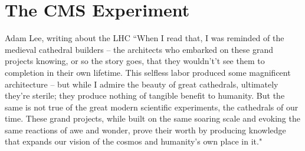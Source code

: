 \chapter{The CMS Experiment}
\label{experiment_chapter}

\begin{chapquote}{Adam Lee, writing about the LHC\cite{LHCCathedial}}
``When I read that, I was reminded of the medieval cathedral builders – the architects who embarked on these grand projects knowing, or so the story goes, that they wouldn't’t see them to completion in their own lifetime. This selfless labor produced some magnificent architecture – but while I admire the beauty of great cathedrals, ultimately they’re sterile; they produce nothing of tangible benefit to humanity. But the same is not true of the great modern scientific experiments, the cathedrals of our time. These grand projects, while built on the same soaring scale and evoking the same reactions of awe and wonder, prove their worth by producing knowledge that expands our vision of the cosmos and humanity’s own place in it."
\end{chapquote}%

